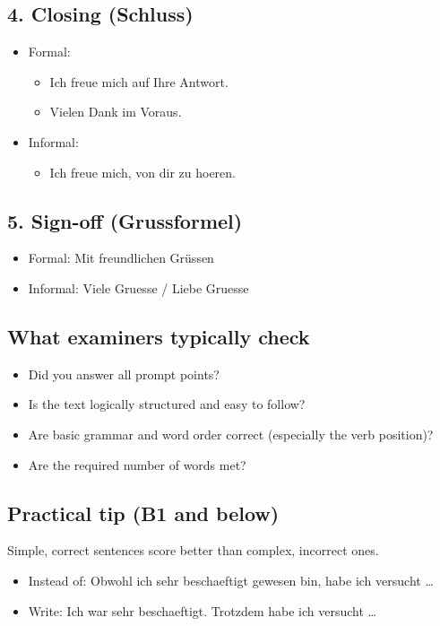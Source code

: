 \documentclass[a4paper]{article}
\begin{document}
        \subsection{4. Closing (Schluss)}
            \begin{itemize}
                \item Formal:
                \begin{itemize}
                    \item Ich freue mich auf Ihre Antwort.
                    \item Vielen Dank im Voraus.
                \end{itemize}
                \item Informal:
                \begin{itemize}
                    \item Ich freue mich, von dir zu hoeren.
                \end{itemize}
            \end{itemize}
        
        \subsection{5. Sign-off (Grussformel)}
            \begin{itemize}
                \item Formal: Mit freundlichen Grüssen
                \item Informal: Viele Gruesse / Liebe Gruesse
            \end{itemize}
        
        \subsection{What examiners typically check}
            \begin{itemize}
                \item Did you answer all prompt points?
                \item Is the text logically structured and easy to follow?
                \item Are basic grammar and word order correct (especially the verb position)?
                \item Are the required number of words met?
            \end{itemize}
        
        \subsection{Practical tip (B1 and below)}
            Simple, correct sentences score better than complex, incorrect ones.
            \begin{itemize}
                \item Instead of: Obwohl ich sehr beschaeftigt gewesen bin, habe ich versucht \dots
                \item Write: Ich war sehr beschaeftigt. Trotzdem habe ich versucht \dots
            \end{itemize}
\end{document}
